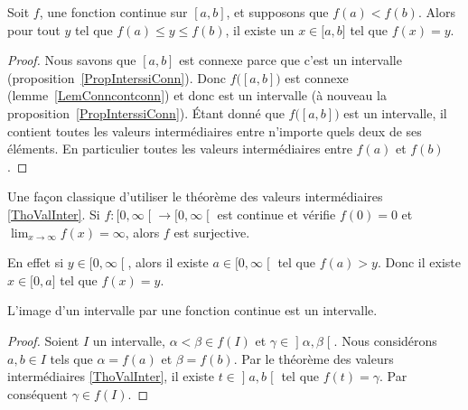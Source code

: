 \begin{theorem}        \label{ThoValInter}
	Soit \( f\), une fonction continue sur \( [a,b]\), et supposons que \( f(a)<f(b)\). Alors pour tout \( y\) tel que \( f(a)\leq y\leq f(b)\), il existe un \( x\in\mathopen[ a , b \mathclose]\) tel que \( f(x)=y\).
\end{theorem}

\begin{proof}
	Nous savons que \( [a,b]\) est connexe parce que c'est un intervalle (proposition~\ref{PropInterssiConn}). Donc \( f\big( [a,b] \big)\) est connexe (lemme~\ref{LemConncontconn}) et donc est un intervalle (à nouveau la proposition~\ref{PropInterssiConn}). Étant donné que \( f\big( [a,b] \big)\) est un intervalle, il contient toutes les valeurs intermédiaires entre n'importe quels deux de ses éléments. En particulier toutes les valeurs intermédiaires entre \( f(a)\) et \( f(b)\).
\end{proof}

\begin{normaltext}      \label{NORMooTQWWooQVPWIJ}
	Une façon classique d'utiliser le théorème des valeurs intermédiaires \ref{ThoValInter}. Si \( f\colon \mathopen[ 0 , \infty \mathclose[\to \mathopen[ 0 , \infty \mathclose[\) est continue et vérifie \( f(0)=0\) et \( \lim_{x\to \infty} f(x)=\infty\), alors \( f\) est surjective.

	En effet si \( y\in \mathopen[ 0 , \infty \mathclose[\), alors il existe \( a\in\mathopen[ 0 , \infty \mathclose[\) tel que \( f(a)>y\). Donc il existe \( x\in \mathopen[ 0 , a \mathclose]\) tel que \( f(x)=y\).
\end{normaltext}

\begin{corollary}       \label{CorImInterInter}
	L'image d'un intervalle par une fonction continue est un intervalle.
\end{corollary}

\begin{proof}
	Soient \( I\) un intervalle, \( \alpha<\beta\in f(I)\) et \( \gamma\in\mathopen] \alpha , \beta \mathclose[\). Nous considérons \(a,b\in I\) tels que \( \alpha=f(a)\) et \( \beta=f(b)\). Par le théorème des valeurs intermédiaires \ref{ThoValInter}, il existe \( t\in\mathopen] a , b \mathclose[\) tel que \( f(t)=\gamma\). Par conséquent \( \gamma\in f(I)\).
\end{proof}

